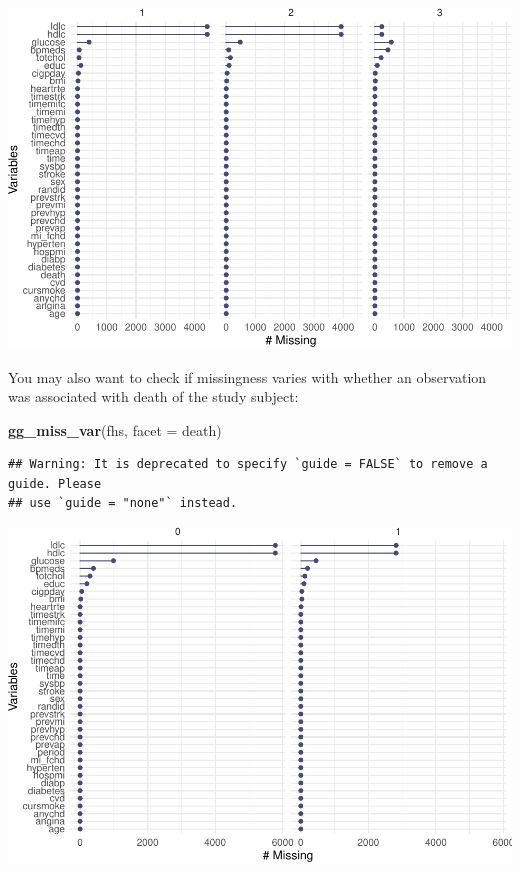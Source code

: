 \documentclass[
]{book}
\newenvironment{Shaded}{\begin{snugshade}}{\end{snugshade}}
\newcommand{\DataTypeTok}[1]{\textcolor[rgb]{0.13,0.29,0.53}{#1}}
\newcommand{\KeywordTok}[1]{\textcolor[rgb]{0.13,0.29,0.53}{\textbf{#1}}}
\newcommand{\NormalTok}[1]{#1}
\begin{document}
\includegraphics{adv_epi_analysis_files/figure-latex/unnamed-chunk-175-1.pdf}

You may also want to check if missingness varies with whether an observation
was associated with death of the study subject:

\begin{Shaded}
\begin{Highlighting}[]
\KeywordTok{gg_miss_var}\NormalTok{(fhs, }\DataTypeTok{facet =}\NormalTok{ death)}
\end{Highlighting}
\end{Shaded}

\begin{verbatim}
## Warning: It is deprecated to specify `guide = FALSE` to remove a guide. Please
## use `guide = "none"` instead.
\end{verbatim}

\includegraphics{adv_epi_analysis_files/figure-latex/unnamed-chunk-176-1.pdf}
\end{document}
